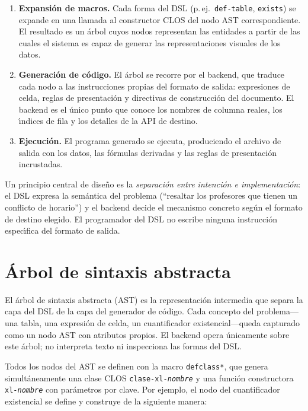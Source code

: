 \begin{enumerate}
  \item \textbf{Expansi\'on de macros.}  Cada forma del DSL
    (p.\,ej.\ \texttt{def-table}, \texttt{exists}) se expande en una llamada
    al constructor CLOS del nodo AST correspondiente.  El resultado es un
    \'arbol cuyos nodos representan las entidades a partir de las cuales el
    sistema es capaz de generar las representaciones visuales de los datos.

  \item \textbf{Generaci\'on de c\'odigo.}  El \'arbol se recorre por el
    backend, que traduce cada nodo a las instrucciones propias del formato de
    salida: expresiones de celda, reglas de presentaci\'on y directivas de
    construcci\'on del documento.  El backend es el \'unico punto que conoce
    los nombres de columna reales, los \'{\i}ndices de fila y los detalles
    de la API de destino.

  \item \textbf{Ejecuci\'on.}  El programa generado se ejecuta, produciendo
    el archivo de salida con los datos, las f\'ormulas derivadas y las reglas
    de presentaci\'on incrustadas.
\end{enumerate}

Un principio central de dise\~no es la \emph{separaci\'on entre intenci\'on
e implementaci\'on}: el DSL expresa la sem\'antica del problema
(``resaltar los profesores que tienen un conflicto de horario'') y el backend
decide el mecanismo concreto seg\'un el formato de destino elegido.  El
programador del DSL no escribe ninguna instrucci\'on espec\'{\i}fica del
formato de salida.

\section{\'Arbol de sintaxis abstracta}
\label{sec:ast-nodos}

El \'arbol de sintaxis abstracta (AST) es la representaci\'on intermedia que
separa la capa del DSL de la capa del generador de c\'odigo.  Cada concepto
del problema---una tabla, una expresi\'on de celda, un cuantificador
existencial---queda capturado como un nodo AST con atributos propios.  El
backend opera \'unicamente sobre este \'arbol; no interpreta texto ni
inspecciona las formas del DSL.

Todos los nodos del AST se definen con la macro \texttt{defclass*}, que
genera simult\'aneamente una clase CLOS \texttt{clase-xl-\textit{nombre}} y
una funci\'on constructora \texttt{xl-\textit{nombre}} con par\'ametros por
clave.  Por ejemplo, el nodo del cuantificador existencial se define y
construye de la siguiente manera:

